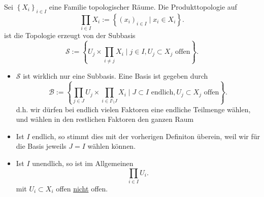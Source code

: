 \begin{definition}
    Sei $\left \{X_i\right\} _{i \in I}$ eine Familie topologischer Räume. Die Produkttopologie auf
    \[
        \prod_{i\in I} X_i := \left \{(x_i)_{i\in I} \mid  x_i \in X_i\right\} 
    .\] 
    ist die Topologie erzeugt von der Subbasis
    \[
    \mathcal{S}  := \left \{U_j \times  \prod_{i\neq j} X_i \mid  j\in I, U_j \subset X_j \text{ offen}\right\} 
    .\] 
\end{definition}
\begin{remark}
    \begin{itemize}
        \item 
    $\mathcal{S}$ ist wirklich nur eine Subbasis. Eine Basis ist gegeben durch
    \[
        \mathcal{B} := \left \{\prod_{j\in J} U_j \times \prod_{i\in I \setminus J} X_i \mid  J\subset I \text{ endlich}, U_j \subset X_j \text{ offen}\right\} 
    .\] 
    d.h. wir dürfen bei endlich vielen Faktoren eine endliche Teilmenge wählen, und wählen in den restlichen Faktoren den ganzen Raum
\item Ist $I$ endlich, so stimmt dies mit der vorherigen Definiton überein, weil wir für die Basis jeweils  $J = I$ wählen können.
\item \Warning Ist  $I$ unendlich, so ist im Allgemeinen
     \[
    \prod_{i\in I} U_i
    .\] 
    mit $U_i \subset X_i$ offen \underline{nicht} offen. 
    \end{itemize}
\end{remark}

